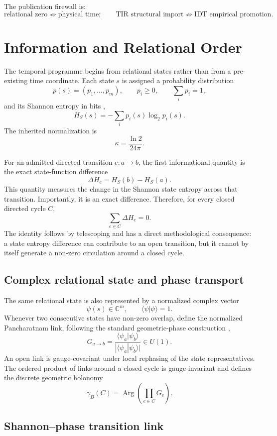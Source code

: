 \documentclass[11pt]{book}
\begin{document}
The publication firewall is:
\[
\boxed{
\text{relational zero}
\not\Rightarrow
\text{physical time};
\qquad
\text{TIR structural import}
\not\Rightarrow
\text{IDT empirical promotion}.
}
\]

\chapter{Information and Relational Order}

The temporal programme begins from relational states rather than from a pre-existing time coordinate. Each state $s$ is assigned a probability distribution
\[
p(s)=(p_1,\ldots,p_m),
\qquad
p_i\geq0,
\qquad
\sum_i p_i=1,
\]
and its Shannon entropy in bits \cite{Shannon1948},
\[
\boxed{
H_S(s)=-\sum_i p_i(s)\log_2p_i(s).
}
\]
The inherited normalization is
\[
\kappa=\frac{\ln2}{24\pi}.
\]

For an admitted directed transition $e:a\to b$, the first informational quantity is the exact state-function difference
\[
\Delta H_e=H_S(b)-H_S(a).
\]
This quantity measures the change in the Shannon state entropy across that transition. Importantly, it is an exact difference. Therefore, for every closed directed cycle $C$,
\[
\boxed{
\sum_{e\in C}\Delta H_e=0.
}
\]
The identity follows by telescoping and has a direct methodological consequence: a state entropy difference can contribute to an open transition, but it cannot by itself generate a non-zero circulation around a closed cycle.

\section{Complex relational state and phase transport}

The same relational state is also represented by a normalized complex vector
\[
\psi(s)\in\mathbb C^m,
\qquad
\langle\psi|\psi\rangle=1.
\]
Whenever two consecutive states have non-zero overlap, define the normalized Pancharatnam link, following the standard geometric-phase construction \cite{Pancharatnam1956,Berry1984},
\[
G_{a\to b}
=
\frac{\langle\psi_a|\psi_b\rangle}
{|\langle\psi_a|\psi_b\rangle|}
\in U(1).
\]
An open link is gauge-covariant under local rephasing of the state representatives. The ordered product of links around a closed cycle is gauge-invariant and defines the discrete geometric holonomy
\[
\gamma_B(C)
=
\operatorname{Arg}\!\left(\prod_{e\in C}G_e\right).
\]

\section{Shannon--phase transition link}
\end{document}
